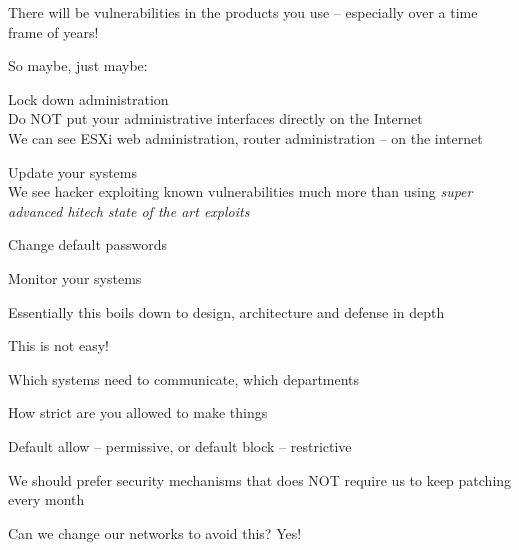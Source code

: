 \documentclass[Screen16to9,17pt]{foils}
\begin{document}

There will be vulnerabilities in the products you use -- especially over a time frame of years!

So maybe, just maybe:
\begin{list2}
\item Lock down administration\\
Do NOT put your administrative interfaces directly on the Internet\\
We can see ESXi web administration, router administration -- on the internet
\item Update your systems\\
We see hacker exploiting known vulnerabilities much more than using \emph{super advanced hitech state of the art exploits}
\item Change default passwords
\item Monitor your systems
\end{list2}

Essentially this boils down to design, architecture and defense in depth



\begin{quote}

\end{quote}

This is not easy!
\begin{list2}
\item Which systems need to communicate, which departments
\item How strict are you allowed to make things
\item Default allow -- permissive, or default block -- restrictive
\end{list2}




\begin{list2}
\item We should prefer security mechanisms that does NOT require us to keep patching every month
\item Can we change our networks to avoid this? Yes!
\end{list2}



\end{document}
